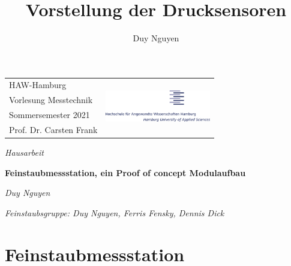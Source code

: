 \documentclass[12pt]{article}
\title{Vorstellung der Drucksensoren}
\author{Duy Nguyen}
\begin{document}
\pagestyle{empty}
\color{smokyblack}

\setlength{\parskip}{1ex}
\begin{table}[t]
  \begin{center}
    \begin{tabular}{p{}r}
      \small{HAW-Hamburg} & \multirow{4}{*}{\includegraphics[width=4.6cm]{haw-logo}} \\
      \small{Vorlesung Messtechnik} &  \\
      \small{Sommersemester 2021} & \\
      \small{Prof. Dr. Carsten Frank} & 
    \end{tabular} 
  \end{center}
\end{table}

\vspace{2cm}

\textsf{\textit{\Large{Hausarbeit}}}

\color{arsenic}
\textsf{\textbf{\huge{Feinstaubmessstation, ein Proof of concept Modulaufbau}}}
\setlength{\parskip}{0.8em}
\color{smokyblack}

\begin{adjustwidth}{3em}{0pt}
\begin{flushleft}
	\textit{Duy Nguyen} 

  \vspace{-12pt}

  \textit{\footnotesize{Feinstaubsgruppe: Duy Nguyen, Ferris Fensky, Dennis Dick}}
\end{flushleft}
\end{adjustwidth}

\tableofcontents
\newpage
\listoffigures
{}
\listoftables
{}


\newpage
\pagestyle{fancy}
\section{Feinstaubmessstation}
\label{sec:feinstaubmessstation}
\end{document}
